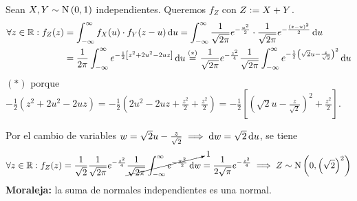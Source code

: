 \begin{ejem}
	Sean $X, Y \sim \operatorname{N}\left(0, 1\right)$ independientes. Queremos $f_Z$ con $Z \vcentcolon= X + Y$.
	\[\begin{aligned}
			\forall z \in \R : f_Z(z) & = \int_{-\infty}^{\infty} f_X(u) \cdot f_Y(z-u) \odif{u} = \int_{-\infty}^{\infty} \frac{1}{\sqrt{2\pi}} e^{-\frac{u^2}{2}} \cdot \frac{1}{\sqrt{2\pi}} e^{-\frac{(z-u)^2}{2}} \odif{u}                                                                                         \\
			                          & = \frac{1}{2\pi} \int_{-\infty}^{\infty} e^{-\frac{1}{2}\left[z^2 + 2u^2 - 2uz\right]} \odif{u} \stackrel{(*)}{=} \frac{1}{\sqrt{2\pi}} e^{-\frac{z^2}{4}} \frac{1}{\sqrt{2\pi}} \int_{-\infty}^{\infty} e^{-\frac{1}{2}\left(\sqrt{2}u - \frac{z}{\sqrt{2}}\right)^2} \odif{u} \\
		\end{aligned}\]
	$(*)$ porque $-\frac{1}{2}(z^2 + 2u^2 - 2uz) = -\frac{1}{2}\left(2u^2 - 2uz +\frac{z^2}{2} + \frac{z^2}{2}\right) = -\frac{1}{2}\left[\left(\sqrt{2}u - \frac{z}{\sqrt{2}}\right)^2 + \frac{z^2}{2}\right]$.

	Por el cambio de variables $w = \sqrt{2} u - \frac{z}{\sqrt{2}} \implies \odif{w} = \sqrt{2} \odif{u} $, se tiene
	\[\forall z \in \R : f_Z(z) = \frac{1}{\sqrt{2}} \frac{1}{\sqrt{2\pi}} e^{-\frac{z^2}{4}} \cancelto{1}{\frac{1}{\sqrt{2\pi}} \int_{-\infty}^{\infty} e^{-\frac{w^2}{2}} \odif{w}} = \frac{1}{2\sqrt{\pi}} e^{-\frac{z^2}{4}} \implies Z \sim \normal{0, \left(\sqrt{2}\right)^2}\]
	\textbf{Moraleja:} la suma de normales independientes es una normal.
\end{ejem}

